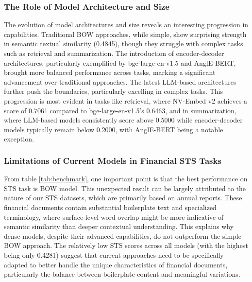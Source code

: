 \subsubsection{The Role of Model Architecture and Size}

The evolution of model architectures and size reveals an interesting progression in capabilities. Traditional BOW approaches, while simple, show surprising strength in semantic textual similarity (0.4845), though they struggle with complex tasks such as retrieval and summarization. The introduction of encoder-decoder architectures, particularly exemplified by bge-large-en-v1.5 and AnglE-BERT, brought more balanced performance across tasks, marking a significant advancement over traditional approaches. The latest LLM-based architectures further push the boundaries, particularly excelling in complex tasks. This progression is most evident in tasks like retrieval, where NV-Embed v2 achieves a score of 0.7061 compared to bge-large-en-v1.5's 0.6463, and in summarization, where LLM-based models consistently score above 0.5000 while encoder-decoder models typically remain below 0.2000, with AnglE-BERT being a notable exception.

\subsubsection{Limitations of Current Models in Financial STS Tasks}

From table \ref{tab:benchmark}, one important point is that the best performance on STS task is BOW model. This unexpected result can be largely attributed to the nature of our STS datasets, which are primarily based on annual reports. These financial documents contain substantial boilerplate text and specialized terminology, where surface-level word overlap might be more indicative of semantic similarity than deeper contextual understanding. This explains why dense models, despite their advanced capabilities, do not outperform the simple BOW approach. The relatively low STS scores across all models (with the highest being only 0.4281) suggest that current approaches need to be specifically adapted to better handle the unique characteristics of financial documents, particularly the balance between boilerplate content and meaningful variations.